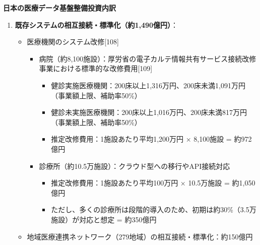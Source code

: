 \documentclass[
  a4paper,
  a4paper,
  11pt]{ltjsbook}
\providecommand{\tightlist}{%
  \setlength{\itemsep}{0pt}\setlength{\parskip}{0pt}}
\begin{document}
\begin{tcolorbox}[enhanced jigsaw, toprule=.15mm, bottomtitle=1mm, coltitle=black, left=2mm, opacityback=0, arc=.35mm, colbacktitle=quarto-callout-note-color!10!white, colback=white, opacitybacktitle=0.6, bottomrule=.15mm, rightrule=.15mm, breakable, title=\textcolor{quarto-callout-note-color}{\faInfo}\hspace{0.5em}{Note}, toptitle=1mm, titlerule=0mm, colframe=quarto-callout-note-color-frame, leftrule=.75mm]

\textbf{日本の医療データ基盤整備投資内訳}

\begin{enumerate}
\def\labelenumi{\arabic{enumi}.}
\tightlist
\item
  \textbf{既存システムの相互接続・標準化（約1,490億円）}：

  \begin{itemize}
  \tightlist
  \item
    医療機関のシステム改修{[}108{]}

    \begin{itemize}
    \tightlist
    \item
      病院（約8,100施設）：厚労省の電子カルテ情報共有サービス接続改修事業における標準的な改修費用{[}109{]}

      \begin{itemize}
      \tightlist
      \item
        健診実施医療機関：200床以上1,316万円、200床未満1,091万円（事業額上限、補助率50\%）
      \item
        健診未実施医療機関：200床以上1,016万円、200床未満817万円（事業額上限、補助率50\%）
      \item
        推定改修費用：1施設あたり平均1,200万円 × 8,100施設 = 約972億円
      \end{itemize}
    \item
      診療所（約10.5万施設）：クラウド型への移行やAPI接続対応

      \begin{itemize}
      \tightlist
      \item
        推定改修費用：1施設あたり平均100万円 × 10.5万施設 = 約1,050億円
      \item
        ただし、多くの診療所は段階的導入のため、初期は約30\%（3.5万施設）が対応と想定
        = 約350億円
      \end{itemize}
    \end{itemize}
  \item
    地域医療連携ネットワーク（279地域）の相互接続・標準化：約150億円


\end{itemize}
\end{enumerate}
\end{tcolorbox}
\end{document}
